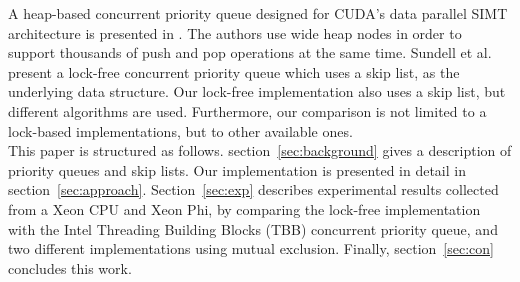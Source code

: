 A heap-based concurrent priority queue designed for CUDA's data parallel SIMT architecture is presented in \cite{DBLP:conf/hipc/HeAP12}.
The authors use wide heap nodes in order to support thousands of push and pop operations at the same time.
Sundell et al.~\cite{Sundell:2005:FLC:1073765.1073770} present a lock-free concurrent priority queue which uses a skip list, as the underlying data structure.
Our lock-free implementation also uses a skip list, but different algorithms are used. Furthermore, our comparison is not limited to a lock-based implementations, but to other available ones.\\
 This paper is structured as follows. section~\ref{sec:background} gives a description of priority queues and skip lists. Our implementation is presented in detail in section~\ref{sec:approach}. Section~\ref{sec:exp} describes experimental results collected from a Xeon CPU and Xeon Phi, by comparing the lock-free implementation with the Intel Threading Building Blocks (TBB) concurrent priority queue, and two different implementations using mutual exclusion. Finally, section~\ref{sec:con} concludes this work.
